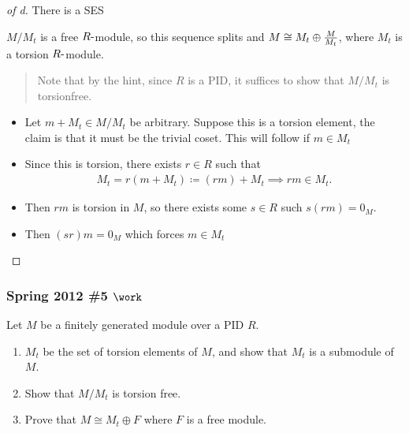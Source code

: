 \begin{solution}
\begin{proof}[of d]
\envlist

There is a SES

\begin{center}
\end{center}

\begin{claim}

\(M/M_t\) is a free \(R{\hbox{-}}\)module, so this sequence splits and
\(M\cong M_t \oplus {M\over M_t}\), where \(M_t\) is a torsion
\(R{\hbox{-}}\)module.

\begin{quote}
Note that by the hint, since \(R\) is a PID, it suffices to show that
\(M/M_t\) is torsionfree.
\end{quote}

\end{claim}

\begin{itemize}
\tightlist
\item
  Let \(m+M_t \in M/M_t\) be arbitrary. Suppose this is a torsion
  element, the claim is that it must be the trivial coset. This will
  follow if \(m\in M_t\)
\item
  Since this is torsion, there exists \(r\in R\) such that
  \begin{align*}
  M_t = r(m + M_t) \coloneqq(rm) + M_t \implies rm\in M_t
  .\end{align*}
\item
  Then \(rm\) is torsion in \(M\), so there exists some \(s\in R\) such
  \(s(rm) = 0_M\).
\item
  Then \((sr)m = 0_M\) which forces \(m\in M_t\)
\end{itemize}

\end{proof}

\end{solution}

\hypertarget{spring-2012-5-work}{%
\subsubsection{\texorpdfstring{Spring 2012 \#5
\(\work\)}{Spring 2012 \#5 \textbackslash work}}\label{spring-2012-5-work}}

Let \(M\) be a finitely generated module over a PID \(R\).

\begin{enumerate}
\def\labelenumi{\alph{enumi}.}
\item
  \(M_t\) be the set of torsion elements of \(M\), and show that \(M_t\)
  is a submodule of \(M\).
\item
  Show that \(M/M_t\) is torsion free.
\item
  Prove that \(M \cong M_t \oplus F\) where \(F\) is a free module.
\end{enumerate}

